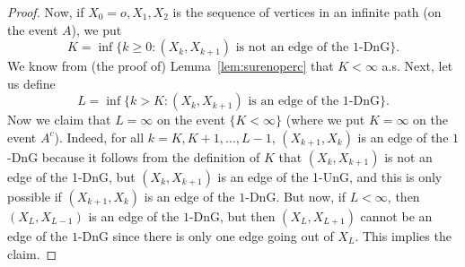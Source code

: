 \documentclass{article}
\theoremstyle{definition}
\newcommand{\1}{\mathbbm{1}}
\newcommand{\0}{\mathbf{o}}
\begin{document}
\begin{proof}

Now, if $X_0=o,X_1,X_2$ is the sequence of vertices in an infinite path (on the event $A$), we put
\[ K=\inf \{ k \geq 0 \colon (X_k,X_{k+1}) \text{ is not an edge of the $1$-DnG} \}. \]
We know from (the proof of) Lemma~\ref{lem:surenoperc} that $K<\infty$ a.s. Next, let us define
\[ L=\inf \{ k > K \colon 
(X_{k},X_{k+1})\text{ is an edge of the 1-DnG}\}. \]
Now we claim that $L=\infty$ on the event $\{ K<\infty\}$ (where we put $K=\infty$ on the event $A^c$). Indeed, for all $k=K,K+1,\ldots,L-1$, $(X_{k+1},X_k)$ is an edge of the $1$-DnG because it follows from the definition of $K$ that $(X_{k},X_{k+1})$ is not an edge of the 1-DnG, but $(X_k,X_{k+1})$ is an edge of the 1-UnG, and this is only possible if $(X_{k+1},X_k)$ is an edge of the $1$-DnG. But now, if $L<\infty$, then $(X_{L},X_{L-1})$ is an edge of the $1$-DnG, but then $(X_{L},X_{L+1})$ cannot be an edge of the $1$-DnG since there is only one edge going out of $X_L$. This implies the claim.



\end{proof}
\end{document}
